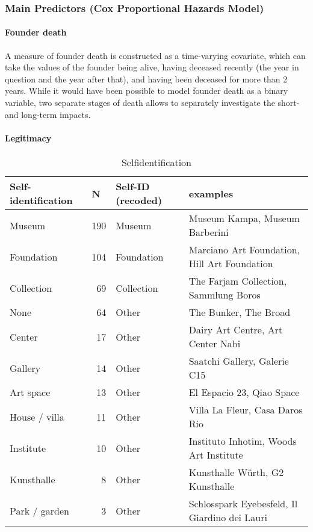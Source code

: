 \documentclass[12pt]{article}
\begin{document}
\subsubsection*{Main Predictors (Cox Proportional Hazards Model)}


\paragraph*{Founder death}

A measure of founder death is constructed as a time-varying covariate, which can take the values of the founder being alive, having deceased recently (the year in question and the year after that), and having been deceased for more than 2 years.
While it would have been possible to model founder death as a binary variable, two separate stages of death allows to separately investigate the short- and long-term impacts.
\paragraph*{Legitimacy}


\begin{table}[ht]
\centering
\begin{tabular}{lrll}
  \hline 
 \multicolumn{1}{l}{Self-identification} & \multicolumn{1}{l}{N} & \multicolumn{1}{l}{Self-ID (recoded)} & \multicolumn{1}{l}{examples}\\ 
 \hline
 Museum & 190 & Museum & Museum Kampa, Museum Barberini \\ 
  Foundation & 104 & Foundation & Marciano Art Foundation, Hill Art Foundation \\ 
  Collection &  69 & Collection & The Farjam Collection, Sammlung Boros \\ 
  None &  64 & Other & The Bunker, The Broad \\ 
  Center &  17 & Other & Dairy Art Centre, Art Center Nabi \\ 
  Gallery &  14 & Other & Saatchi Gallery, Galerie C15 \\ 
  Art space &  13 & Other & El Espacio 23, Qiao Space \\ 
  House / villa &  11 & Other & Villa La Fleur, Casa Daros Rio \\ 
  Institute &  10 & Other & Instituto Inhotim, Woods Art Institute \\ 
  Kunsthalle &   8 & Other & Kunsthalle Würth, G2 Kunsthalle \\ 
  Park / garden &   3 & Other & Schlosspark Eyebesfeld, Il Giardino dei Lauri \\ 
   \hline
\end{tabular}
\caption{Selfidentification} 
\label{tbl:t_selfid}
\end{table}
\end{document}
